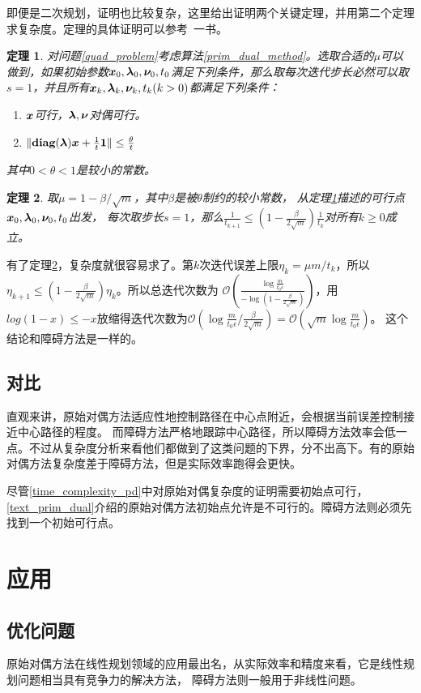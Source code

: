 \documentclass{article}
\newtheorem{thm}{定理}
\begin{document}
即便是二次规划，证明也比较复杂，这里给出证明两个关键定理，并用第二个定理求复杂度。定理的具体证明可以参考~\cite{wright1997primal}一书。
\begin{thm}
    \label{dist}
    对问题\ref{quad_problem}考虑算法\ref{prim_dual_method}。选取合适的$\mu$可以做到，如果初始参数$\bm x _0,\bm \lambda _0,\bm \nu _0,t_0$满足下列条件，那么取每次迭代步长必然可以取$s=1$，并且所有$\bm x _k,\bm \lambda _k,\bm \nu _k,t_k(k>0)$都满足下列条件：
    \begin{enumerate}
        \item $\bm x$可行，$\bm \lambda,\bm \nu$对偶可行。
        \item $\|\textbf{diag}(\bm\lambda)\bm x+\frac{1}{t}\bm 1\|\le \frac{\theta}{t}$
    \end{enumerate}
    其中$0<\theta<1$是较小的常数。
\end{thm}
\begin{thm}
    \label{bound}
    取$\mu=1-\beta/\sqrt m$，其中$\beta$是被$\theta$制约的较小常数，
    从定理\ref{dist}描述的可行点$\bm x _0,\bm \lambda _0,\bm \nu _0,t_0$出发，
    每次取步长$s=1$，那么$\frac{1}{t_{k+1}}\le (1-\frac{\beta}{2\sqrt m})\frac{1}{t_k}$对所有$k\ge 0$成立。
\end{thm}

有了定理\ref{bound}，复杂度就很容易求了。第$k$次迭代误差上限$\eta_k=\mu m/t_k$，所以$\eta_{k+1}\le (1-\frac{\beta}{2\sqrt m})\eta_k$。所以总迭代次数为
$\mathcal O(\frac{\log\frac{m}{t_0\epsilon}}{-\log(1-\frac{\beta}{2\sqrt m})})$，用$log(1-x)\le -x$放缩得迭代次数为$\mathcal O(\log\frac{m}{t_0\epsilon}/\frac{\beta}{2\sqrt m})=\mathcal O(\sqrt m\log\frac{m}{t_0\epsilon})$。
这个结论和障碍方法是一样的。

\subsection{对比}
直观来讲，原始对偶方法适应性地控制路径在中心点附近，会根据当前误差控制接近中心路径的程度。
而障碍方法严格地跟踪中心路径，所以障碍方法效率会低一点。不过从复杂度分析来看他们都做到了这类问题的下界，分不出高下。有的原始对偶方法复杂度差于障碍方法，但是实际效率跑得会更快。

尽管\ref{time_complexity_pd}中对原始对偶复杂度的证明需要初始点可行，\ref{text_prim_dual}介绍的原始对偶方法初始点允许是不可行的。障碍方法则必须先找到一个初始可行点。

\label{time_complexity}
\section{应用}
\subsection{优化问题}
原始对偶方法在线性规划领域的应用最出名，从实际效率和精度来看，它是线性规划问题相当具有竞争力的解决方法，
障碍方法则一般用于非线性问题。
\end{document}
